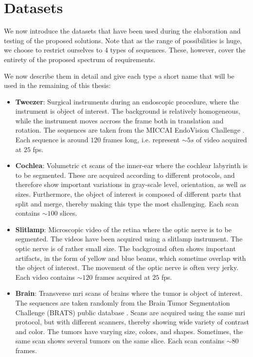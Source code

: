 \section{Datasets}

We now introduce the datasets that have been used during the elaboration and testing of the proposed solutions.
Note that as the range of possibilities is huge, we choose to restrict ourselves to $4$ types of sequences.
These, however, cover the entirety of the proposed spectrum of requirements.

We now describe them in detail and give each type a short name that will be used in the remaining of this thesis:

\begin{itemize}
  \item \textbf{Tweezer}: Surgical instruments during an endoscopic procedure, where the instrument is object of interest.
    The background is relatively homogeneous, while the instrument moves accross the frame both in translation and rotation.
    The sequences are taken from the MICCAI EndoVision Challenge \cite{EndoChall}.
    Each sequence is around $120$ frames long, i.e. represent $\sim 5s$ of video acquired at $25$ fps.
  \item \textbf{Cochlea}: Volumetric \Gls{ct} scans of the inner-ear where the cochlear labyrinth is to be segmented. These are acquired according to different protocols, and therefore show important variations in gray-scale level, orientation, as well as sizes. Furthermore, the object of interest is composed of different parts that split and merge, thereby making this type the most challenging.
    Each scan contains $\sim 100$ slices.
  \item \textbf{Slitlamp}: Microscopic video of the retina where the optic nerve is to be segmented. The videos have been acquired using a slitlamp instrument.
    The optic nerve is of rather small size. The background often shows important artifacts, in the form of yellow and blue beams, which sometime overlap with the object of interest. The movement of the optic nerve is often very jerky.
    Each video contains $\sim 120$ frames acquired at $25$ fps.
  \item \textbf{Brain}: Transverse \gls{mri} scans of brains where the tumor is object of interest. The sequences are taken randomly from the Brain Tumor Segmentation Challenge (BRATS) public database \cite{BRATSChall}.
    Scans are acquired using the same \gls{mri} protocol, but with different scanners, thereby showing wide variety of contrast and color.
    The tumors have varying size, colors, and shapes. Sometimes, the same scan shows several tumors on the same slice.
    Each scan contains $\sim 80$ frames.
\end{itemize}


